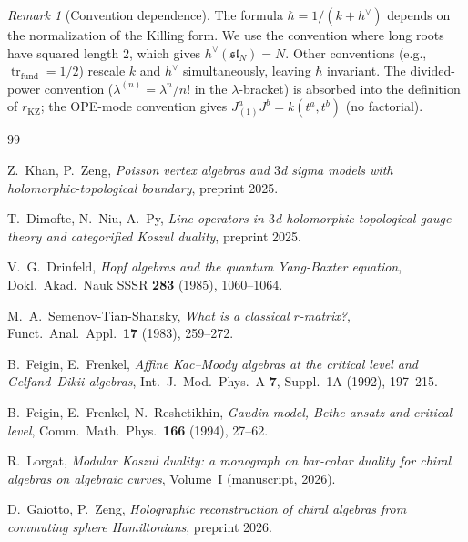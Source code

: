 \documentclass[11pt]{article}
\theoremstyle{plain}
\theoremstyle{definition}
\theoremstyle{remark}
\newtheorem{remark}[theorem]{Remark}
\newcommand{\fsl}{\mathfrak{sl}}
\numberwithin{equation}{section}
\begin{document}
\begin{remark}[Convention dependence]\label{rem:conventions}
The formula $\hbar = 1/(k + h^\vee)$ depends on the normalization
of the Killing form. We use the convention where long roots have
squared length $2$, which gives $h^\vee(\fsl_N) = N$. Other
conventions (e.g., $\operatorname{tr}_{\mathrm{fund}} = 1/2$)
rescale $k$ and $h^\vee$ simultaneously, leaving $\hbar$ invariant.
The divided-power convention ($\lambda^{(n)} = \lambda^n/n!$
in the $\lambda$-bracket) is absorbed into the definition of
$r_{\mathrm{KZ}}$; the OPE-mode convention gives
$J^a_{(1)}J^b = k(t^a, t^b)$ (no factorial).
\end{remark}


\begin{thebibliography}{99}

Z.~Khan, P.~Zeng, \emph{Poisson vertex algebras and $3$d sigma
models with holomorphic-topological boundary}, preprint 2025.

T.~Dimofte, N.~Niu, A.~Py, \emph{Line operators in $3$d
holomorphic-topological gauge theory and categorified Koszul
duality}, preprint 2025.

V.~G.~Drinfeld, \emph{Hopf algebras and the quantum Yang-Baxter
equation}, Dokl.\ Akad.\ Nauk SSSR \textbf{283} (1985), 1060--1064.

M.~A.~Semenov-Tian-Shansky, \emph{What is a classical $r$-matrix?},
Funct.\ Anal.\ Appl.\ \textbf{17} (1983), 259--272.

B.~Feigin, E.~Frenkel,
\emph{Affine Kac--Moody algebras at the critical level and
Gelfand--Dikii algebras}, Int.\ J.\ Mod.\ Phys.\ A \textbf{7},
Suppl.\ 1A (1992), 197--215.

B.~Feigin, E.~Frenkel, N.~Reshetikhin, \emph{Gaudin model, Bethe
ansatz and critical level}, Comm.\ Math.\ Phys.\ \textbf{166}
(1994), 27--62.

R.~Lorgat, \emph{Modular Koszul duality: a monograph on bar-cobar
duality for chiral algebras on algebraic curves}, Volume~I
(manuscript, 2026).

D.~Gaiotto, P.~Zeng, \emph{Holographic reconstruction of chiral
algebras from commuting sphere Hamiltonians}, preprint 2026.

\end{thebibliography}
\end{document}
